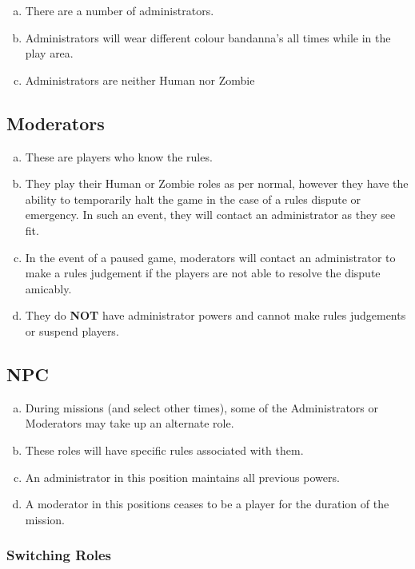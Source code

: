 \documentclass[a4paper,12pt]{article}
\begin{document}
\begin{enumerate}[(a)]
    \item There are a number of administrators.
    \item Administrators will wear different colour bandanna's all times while in the play area.
    \item Administrators are neither Human nor Zombie
\end{enumerate}

\subsection{Moderators}

\begin{enumerate}[(a)]
    \item These are players who know the rules.
    \item They play their Human or Zombie roles as per normal, however they have the ability to temporarily halt the game in the case of a rules dispute or emergency.
    In such an event, they will contact an administrator as they see fit.
    \item In the event of a paused game, moderators will contact an administrator to make a rules judgement if the players are not able to resolve the dispute amicably.
    \item They do {\bf NOT} have administrator powers and cannot make rules judgements or suspend players. 
\end{enumerate}

\subsection{NPC}

\begin{enumerate}[(a)]
    \item During missions (and select other times), some of the Administrators or Moderators may take up an alternate role.
    \item These roles will have specific rules associated with them.
    \item An administrator in this position maintains all previous powers.
    \item A moderator in this positions ceases to be a player for the duration of the mission.
    \end{enumerate}

\subsubsection{Switching Roles}
\end{document}
